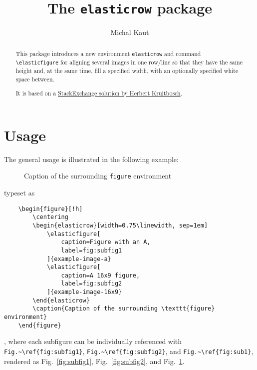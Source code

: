 \documentclass[a4paper]{scrartcl}
\title{The \texttt{elasticrow} package}
\author{Michal Kaut}
\begin{document}
\maketitle

\begin{abstract}
	This package introduces a new environment \verb|elasticrow| and command \verb|\elasticfigure| for aligning several images in one row/line so that they have the same height and, at the same time, fill a specified width, with an optionally specified white space between.
	
	It is based on a \href{https://tex.stackexchange.com/q/227935}{StackExchange solution by Herbert Kruitbosch}.
\end{abstract}

\section{Usage}

The general usage is illustrated in the following example:

\begin{figure}[!h]
	\centering
	\begin{elasticrow}[width=0.75\linewidth, sep=1em]
	\end{elasticrow}
	\caption{Caption of the surrounding \texttt{figure} environment}
	\label{fig:fig1}
\end{figure}

\noindent
typeset as
\begin{verbatim}
	\begin{figure}[!h]
	    \centering
	    \begin{elasticrow}[width=0.75\linewidth, sep=1em]
	        \elasticfigure[
	            caption=Figure with an A,
	            label=fig:subfig1
	    	]{example-image-a}
	    	\elasticfigure[
		        caption=A 16x9 figure,
		        label=fig:subfig2
	    	]{example-image-16x9}
	    \end{elasticrow}
	    \caption{Caption of the surrounding \texttt{figure} environment}
	\end{figure}
\end{verbatim}

, where each subfigure can be individually referenced with \verb*|Fig.~\ref{fig:subfig1}|, \verb*|Fig.~\ref{fig:subfig2}|, and \verb*|Fig.~\ref{fig:sub1}|, rendered as Fig.~\ref{fig:subfig1}, Fig.~\ref{fig:subfig2}, and Fig.~\ref{fig:fig1}.
\end{document}
